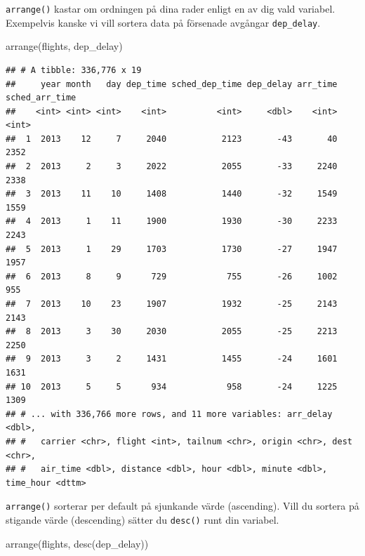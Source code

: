 \documentclass[
]{book}
\newenvironment{Shaded}{\begin{snugshade}}{\end{snugshade}}
\newcommand{\FunctionTok}[1]{\textcolor[rgb]{0.00,0.00,0.00}{#1}}
\newcommand{\NormalTok}[1]{#1}
\begin{document}
\texttt{arrange()} kastar om ordningen på dina rader enligt en av dig vald variabel. Exempelvis kanske vi vill sortera data på försenade avgångar \texttt{dep\_delay}.

\begin{Shaded}
\begin{Highlighting}[]
\FunctionTok{arrange}\NormalTok{(flights, dep\_delay)}
\end{Highlighting}
\end{Shaded}

\begin{verbatim}
## # A tibble: 336,776 x 19
##     year month   day dep_time sched_dep_time dep_delay arr_time sched_arr_time
##    <int> <int> <int>    <int>          <int>     <dbl>    <int>          <int>
##  1  2013    12     7     2040           2123       -43       40           2352
##  2  2013     2     3     2022           2055       -33     2240           2338
##  3  2013    11    10     1408           1440       -32     1549           1559
##  4  2013     1    11     1900           1930       -30     2233           2243
##  5  2013     1    29     1703           1730       -27     1947           1957
##  6  2013     8     9      729            755       -26     1002            955
##  7  2013    10    23     1907           1932       -25     2143           2143
##  8  2013     3    30     2030           2055       -25     2213           2250
##  9  2013     3     2     1431           1455       -24     1601           1631
## 10  2013     5     5      934            958       -24     1225           1309
## # ... with 336,766 more rows, and 11 more variables: arr_delay <dbl>,
## #   carrier <chr>, flight <int>, tailnum <chr>, origin <chr>, dest <chr>,
## #   air_time <dbl>, distance <dbl>, hour <dbl>, minute <dbl>, time_hour <dttm>
\end{verbatim}

\texttt{arrange()} sorterar per default på sjunkande värde (ascending). Vill du sortera på stigande värde (descending) sätter du \texttt{desc()} runt din variabel.

\begin{Shaded}
\begin{Highlighting}[]
\FunctionTok{arrange}\NormalTok{(flights, }\FunctionTok{desc}\NormalTok{(dep\_delay))}
\end{Highlighting}
\end{Shaded}
\end{document}
